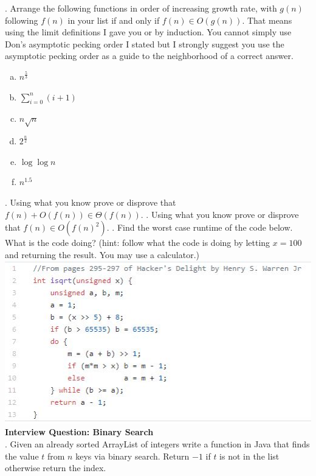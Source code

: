 \documentclass[12pt]{article}
\begin{document}
\newpage
{}. Arrange the following functions in order of increasing growth rate, with $g(n)$ following $f(n)$ in your list if and only if $f(n) \in O(g(n))$. That means using the limit definitions I gave you or by induction. You cannot simply use Don's asymptotic pecking order I stated but I strongly suggest you use the asymptotic pecking order as a guide to the neighborhood of a correct answer.\\
\begin{enumerate}[a)]
\item  $n^{\frac{5}{3}}$\\
\item $\sum\limits_{i = 0}^{n} (i + 1)$\\
\item $n\sqrt{n}$\\
\item  $2^{\frac{n}{2}}$\\
\item  $\log{\log{n}}$\\
\item  $n^{1.5}$\\
\end{enumerate}
. Using what you know prove or disprove that $f(n) + O(f(n)) \in \Theta(f(n))$.
. Using what you know prove or disprove that $f(n)\in O(f(n)^2)$.
\newpage
{}. Find the worst case runtime of the code below. What is the code doing? (hint: follow what the code is doing by letting $x = 100$ and returning the result. You may use a calculator.)\\
\includegraphics[width=\linewidth]{isqrt.jpg} 
\newpage
\noindent\textbf{Interview Question: Binary Search}\\
. Given an already sorted ArrayList of integers write a function in Java that finds the value $t$ from $n$ keys via binary search. Return $-1$ if $t$ is not in the list otherwise return the index.\\
\end{document}
